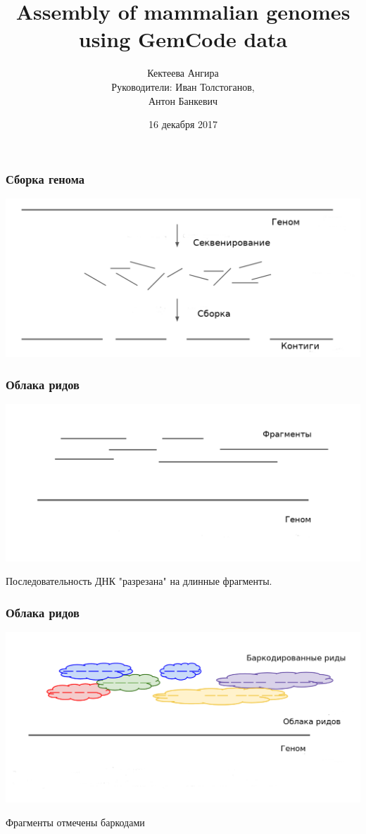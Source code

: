 \documentclass[12pt,pdf,hyperref={unicode}]{beamer}
\title{Assembly of mammalian genomes using GemCode data }
\author[Кектеева Ангира]{Кектеева Ангира\\{\small \vspace{1cm}   Руководители: Иван Толстоганов, \\Антон Банкевич}}
\date{16 декабря 2017}
\begin{document}
\maketitle

\begin{frame}
\frametitle{Сборка генома}
\begin{flushleft}
\includegraphics[scale=0.27]{genome_assembly.png}
\end{flushleft}
\end{frame}

\begin{frame}
\frametitle{Облака ридов}
\begin{flushleft}
\includegraphics[scale=0.25]{fragments.png}
\end{flushleft}

Последовательность ДНК "разрезана" на длинные фрагменты.
\end{frame}

\begin{frame}
\frametitle{Облака ридов}
\begin{flushleft}
\includegraphics[scale=0.26]{cloud_reads.png}
\end{flushleft}
Фрагменты отмечены баркодами
\end{frame}
\end{document}
